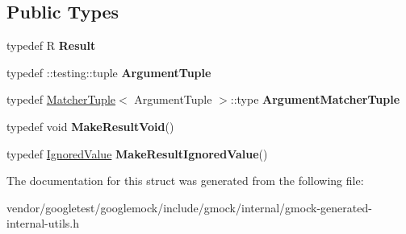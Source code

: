 \subsection*{Public Types}
\begin{DoxyCompactItemize}
\item 
typedef R {\bfseries Result}\hypertarget{structtesting_1_1internal_1_1Function_3_01R_07_08_4_a5c228a886ef598ac10988f8de5e32ca1}{}\label{structtesting_1_1internal_1_1Function_3_01R_07_08_4_a5c228a886ef598ac10988f8de5e32ca1}

\item 
typedef \+::testing\+::tuple {\bfseries Argument\+Tuple}\hypertarget{structtesting_1_1internal_1_1Function_3_01R_07_08_4_ad483c3128c470d8cdb55c3ac1c575c11}{}\label{structtesting_1_1internal_1_1Function_3_01R_07_08_4_ad483c3128c470d8cdb55c3ac1c575c11}

\item 
typedef \hyperlink{structtesting_1_1internal_1_1MatcherTuple}{Matcher\+Tuple}$<$ Argument\+Tuple $>$\+::type {\bfseries Argument\+Matcher\+Tuple}\hypertarget{structtesting_1_1internal_1_1Function_3_01R_07_08_4_a9bec5cf8937e8af99dedab2f40129fab}{}\label{structtesting_1_1internal_1_1Function_3_01R_07_08_4_a9bec5cf8937e8af99dedab2f40129fab}

\item 
typedef void {\bfseries Make\+Result\+Void}()\hypertarget{structtesting_1_1internal_1_1Function_3_01R_07_08_4_a666b5ad3bf155529d3a0f9fe6d5c897b}{}\label{structtesting_1_1internal_1_1Function_3_01R_07_08_4_a666b5ad3bf155529d3a0f9fe6d5c897b}

\item 
typedef \hyperlink{classtesting_1_1internal_1_1IgnoredValue}{Ignored\+Value} {\bfseries Make\+Result\+Ignored\+Value}()\hypertarget{structtesting_1_1internal_1_1Function_3_01R_07_08_4_aa459093a5b52ef54e2544b5a6c054383}{}\label{structtesting_1_1internal_1_1Function_3_01R_07_08_4_aa459093a5b52ef54e2544b5a6c054383}

\end{DoxyCompactItemize}


The documentation for this struct was generated from the following file\+:\begin{DoxyCompactItemize}
\item 
vendor/googletest/googlemock/include/gmock/internal/gmock-\/generated-\/internal-\/utils.\+h\end{DoxyCompactItemize}
